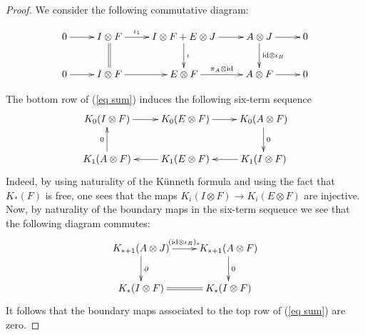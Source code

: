 \documentclass[a4paper,10pt]{amsart}
\numberwithin{equation}{section}
\numberwithin{theorem}{section}
\newcommand{\id}{\mathrm{id}}
\begin{document}
\begin{proof}
	We consider the following commutative diagram: 
	
	\begin{equation}	\label{eq sum}
		\begin{gathered}		
		\xymatrix{
			0 \ar[r] & I \otimes F \ar@{=}[d] \ar[r]^-{\iota_1} & I \otimes F + E \otimes J \ar[d]^{\iota} \ar[r] & A \otimes J \ar[d]^-{\id \otimes \iota_B} \ar[r] & 0  \\
			0 \ar[r] & I \otimes F \ar[r] & E \otimes F \ar[r]^-{\pi_A \otimes \id} & A \otimes F \ar[r] & 0
		}
		\end{gathered}
		\end{equation}
		
	The bottom row  of (\ref{eq sum}) induces the following six-term sequence
	\[
		\xymatrix{
			K_0(I \otimes F) \ar[r] & K_0(E \otimes F) \ar[r] & K_0(A \otimes F) \ar[d]^0 \\
			K_1(A \otimes F) \ar[u]^0 & K_1(E \otimes F) \ar[l] & K_1(I \otimes F) \ar[l]
		}
	\]
	Indeed, by using naturality of the K\"unneth formula and using the fact that $K_*(F)$ is free, one sees that the maps $K_i(I \otimes F) \to K_i(E \otimes F)$ are injective. Now, by naturality of the boundary maps in the six-term sequence we see that the following diagram commutes:
	\[
		\xymatrix{
			K_{*+1}(A \otimes J) \ar[r]^-{(\id \otimes \iota_B)_*} \ar[d]^\partial & K_{*+1}(A \otimes F) \ar[d]^0 \\
			K_*(I \otimes F) \ar@{=}[r] & K_*(I \otimes F)
		}
	\]
	It follows that the boundary maps associated to the top row  of (\ref{eq sum}) are zero.
\end{proof}
\end{document}
